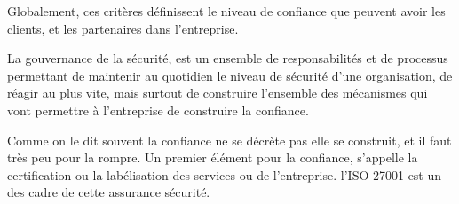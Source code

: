Globalement, ces critères définissent le niveau de confiance que peuvent avoir les clients, et les partenaires dans l’entreprise.

La gouvernance de la sécurité, est un ensemble de responsabilités et de processus permettant de maintenir au quotidien le niveau de sécurité d’une organisation, de réagir au plus vite, mais surtout de construire l’ensemble des mécanismes qui vont permettre à l’entreprise de construire la confiance.

Comme on le dit souvent la confiance ne se décrète pas elle se construit, et il faut très peu pour la rompre. Un premier élément pour la confiance, s’appelle la certification ou la labélisation des services ou de l'entreprise. l'ISO 27001 est un des cadre de cette assurance sécurité.

\utocomplete